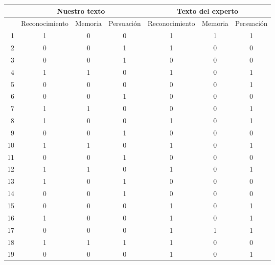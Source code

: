 \begin{table}
\centering
\tiny
\begin{tabular}{|r|c|c|c|c|c|c|}
   & \multicolumn{3}{c|}{Nuestro texto}     & \multicolumn{3}{c|}{Texto del experto}   \\\hline
   & Reconocimiento & Memoria & Persuación & Reconocimiento & Memoria & Persuación \\\hline \hline

1 &         1 &         0 &         0 &         1 &         1 &         1 \\
2 &         0 &         0 &         1 &         1 &         0 &         0 \\
3 &         0 &         0 &         1 &         0 &         0 &         0 \\
4 &         1 &         1 &         0 &         1 &         0 &         1 \\
5 &         0 &         0 &         0 &         0 &         0 &         1 \\
6 &         0 &         0 &         1 &         0 &         0 &         0 \\
7 &         1 &         1 &         0 &         0 &         0 &         1 \\
8 &         1 &         0 &         0 &         1 &         0 &         1 \\
9 &         0 &         0 &         1 &         0 &         0 &         0 \\
10 &         1 &         1 &         0 &         1 &         0 &         1 \\
11 &         0 &         0 &         1 &         0 &         0 &         0 \\
12 &         1 &         1 &         0 &         1 &         0 &         1 \\
13 &         1 &         0 &         1 &         0 &         0 &         0 \\
14 &         0 &         0 &         1 &         0 &         0 &         0 \\
15 &         0 &         0 &         0 &         1 &         0 &         1 \\
16 &         1 &         0 &         0 &         1 &         0 &         1 \\
17 &         0 &         0 &         0 &         1 &         1 &         1 \\
18 &         1 &         1 &         1 &         1 &         0 &         0 \\
19 &         0 &         0 &         0 &         1 &         0 &         1 \\

\end{tabular}
\end{table}
